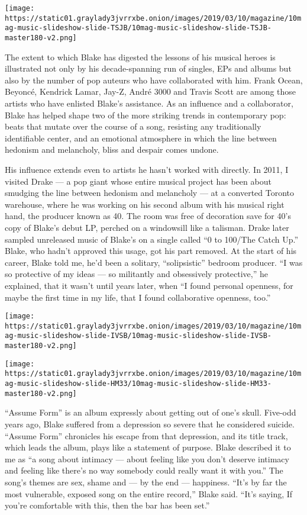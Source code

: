 \texttt{[image: https://static01.graylady3jvrrxbe.onion/images/2019/03/10/magazine/10mag-music-slideshow-slide-TSJB/10mag-music-slideshow-slide-TSJB-master180-v2.png]}

The extent to which Blake has digested the lessons of his musical heroes
is illustrated not only by his decade-spanning run of singles, EPs and
albums but also by the number of pop auteurs who have collaborated with
him. Frank Ocean, Beyoncé, Kendrick Lamar, Jay-Z, André 3000 and Travis
Scott are among those artists who have enlisted Blake's assistance. As
an influence and a collaborator, Blake has helped shape two of the more
striking trends in contemporary pop: beats that mutate over the course
of a song, resisting any traditionally identifiable center, and an
emotional atmosphere in which the line between hedonism and melancholy,
bliss and despair comes undone.

His influence extends even to artists he hasn't worked with directly. In
2011, I visited Drake --- a pop giant whose entire musical project has
been about smudging the line between hedonism and melancholy --- at a
converted Toronto warehouse, where he was working on his second album
with his musical right hand, the producer known as 40. The room was free
of decoration save for 40's copy of Blake's debut LP, perched on a
windowsill like a talisman. Drake later sampled unreleased music of
Blake's on a single called ``0 to 100/The Catch Up.'' Blake, who hadn't
approved this usage, got his part removed. At the start of his career,
Blake told me, he'd been a solitary, ``solipsistic'' bedroom producer.
``I was so protective of my ideas --- so militantly and obsessively
protective,'' he explained, that it wasn't until years later, when ``I
found personal openness, for maybe the first time in my life, that I
found collaborative openness, too.''

\texttt{[image: https://static01.graylady3jvrrxbe.onion/images/2019/03/10/magazine/10mag-music-slideshow-slide-IVSB/10mag-music-slideshow-slide-IVSB-master180-v2.png]}

\texttt{[image: https://static01.graylady3jvrrxbe.onion/images/2019/03/10/magazine/10mag-music-slideshow-slide-HM33/10mag-music-slideshow-slide-HM33-master180-v2.png]}

``Assume Form'' is an album expressly about getting out of one's skull.
Five-odd years ago, Blake suffered from a depression so severe that he
considered suicide. ``Assume Form'' chronicles his escape from that
depression, and its title track, which leads the album, plays like a
statement of purpose. Blake described it to me as ``a song about
intimacy --- about feeling like you don't deserve intimacy and feeling
like there's no way somebody could really want it with you.'' The song's
themes are sex, shame and --- by the end --- happiness. ``It's by far
the most vulnerable, exposed song on the entire record,'' Blake said.
``It's saying, If you're comfortable with this, then the bar has been
set.''

